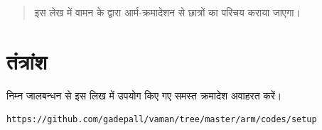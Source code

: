 \documentclass[journal,12pt,twocolumn]{IEEEtran}
\begin{document}



%

\begin{abstract}
इस लेख में  वामन  के द्वारा आर्म-क्रमादेशन  से छात्रों का परिचय कराया जाएगा।


\end{abstract}

\printnomenclature[1.7in]


\section{तंत्रांश}
%
निम्न जालबन्धन से इस लिख में उपयोग किए गए समस्त क्रमादेश अवाहरत करें।
\begin{lstlisting}
https://github.com/gadepall/vaman/tree/master/arm/codes/setup
\end{lstlisting}
\end{document}

